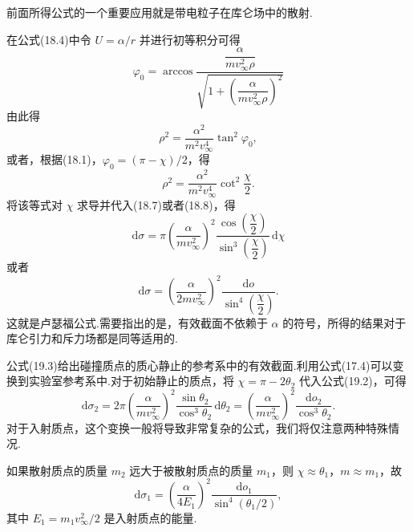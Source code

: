 前面所得公式的一个重要应用就是带电粒子在库仑场中的散射.

在公式(18.4)中令 $U=\alpha/r$ 并进行初等积分可得
\begin{equation*}
  \varphi_0=\arccos
  \frac{\dfrac{\alpha}{mv_\infty^2\rho}}
  {\sqrt{1+\left(\dfrac{\alpha}{mv_\infty^2\rho}\right)^2}}
\end{equation*}
由此得
\begin{equation*}
  \rho^2=\frac{\alpha^2}{m^2v_\infty^4}\tan^2\varphi_0,
\end{equation*}
或者，根据(18.1)，$\varphi_0=(\pi-\chi)/2$，得
\begin{equation}
  \rho^2=\frac{\alpha^2}{m^2v_\infty^4}\cot^2\frac{\chi}{2}.
\end{equation}
将该等式对 $\chi$ 求导并代入(18.7)或者(18.8)，得
\begin{equation}
  \mathrm{d}\sigma=\pi\left(\frac{\alpha}{mv_\infty^2}\right)^2
  \frac{\cos\left(\dfrac{\chi}{2}\right)}{\sin^3\left(\dfrac{\chi}{2}\right)}\,\mathrm{d}\chi
\end{equation}
或者
\begin{equation}
  \mathrm{d}\sigma=\left(\frac{\alpha}{2mv_\infty^2}\right)^2
  \frac{\mathrm{d}o}{\sin^4\left(\dfrac{\chi}{2}\right)}.
\end{equation}
这就是卢瑟福公式.需要指出的是，有效截面不依赖于 $\alpha$ 的符号，所得的结果对于库仑引力和斥力场都是同等适用的.

公式(19.3)给出碰撞质点的质心静止的参考系中的有效截面.利用公式(17.4)可以变换到实验室参考系中.对于初始静止的质点，将 $\chi=\pi-2\theta_2$ 代入公式(19.2)，可得
\begin{equation}
  \mathrm{d}\sigma_2=2\pi\left(\frac{\alpha}{mv_\infty^2}\right)^2
  \frac{\sin\theta_2}{\cos^3\theta_2}\,\mathrm{d}\theta_2
  =\left(\frac{\alpha}{mv_\infty^2}\right)^2
  \frac{\mathrm{d}o_2}{\cos^3\theta_2}.
\end{equation}
对于入射质点，这个变换一般将导致非常复杂的公式，我们将仅注意两种特殊情况.

如果散射质点的质量 $m_2$ 远大于被散射质点的质量 $m_1$，则 $\chi\approx\theta_1$，$m\approx m_1$，故
\begin{equation}
  \mathrm{d}\sigma_1=\left(\frac{\alpha}{4E_1}\right)^2
  \frac{\mathrm{d}o_1}{\sin^4(\theta_1/2)},
\end{equation}
其中 $E_1=m_1v_\infty^2/2$ 是入射质点的能量.

